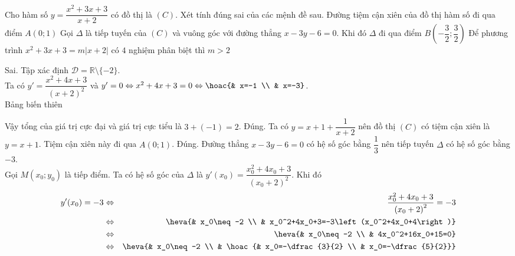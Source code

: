 \begin{ex}%
Cho hàm số $y=\dfrac{x^2+3 x+3}{x+2}$ có đồ thị là $(C)$. Xét tính đúng sai của các mệnh đề sau.
{\True Đường tiệm cận xiên của đồ thị hàm số đi qua điểm $A(0;1)$}
{\True Gọi $\Delta$ là tiếp tuyến của $(C)$ và vuông góc với đường thẳng $x-3 y-6=0$. Khi đó $\Delta$ đi qua điểm $B\left(-\dfrac{3}{2};\dfrac{3}{2}\right)$}
{Để phương trình $x^2+3x+3=m|x+2|$ có $4$ nghiệm phân biệt thì $m>2$}
\loigiai
{\begin{itemchoice}
\itemch Sai. Tập xác định $\mathscr{D}=\mathbb{R}\setminus\{-2\}$.\\
Ta có $y'=\dfrac{x^2+4x+3}{(x+2)^2}$ và $y'=0\Leftrightarrow x^2+4x+3=0\Leftrightarrow\hoac{& x=-1 \\ & x=-3}$.\\
Bảng biến thiên
\begin{center}
\end{center}
Vậy tổng của giá trị cực đại và giá trị cực tiểu là $3+(-1)=2$.
\itemch Đúng. Ta có $y=x+1+\dfrac{1}{x+2}$ nên đồ thị $(C)$ có tiệm cận xiên là $y=x+1$. Tiệm cận xiên này đi qua $A(0;1)$.
\itemch Đúng. Đường thẳng $x-3y-6=0$ có hệ số góc bằng $\dfrac{1}{3}$ nên tiếp tuyến $\Delta$ có hệ số góc bằng $-3$.\\
Gọi $M\left(x_0;y_0\right)$ là tiếp điểm. Ta có hệ số góc của $\Delta$ là $y'(x_0)=\dfrac{x_0^2+4x_0+3}{\left(x_0+2\right)^2}$. Khi đó
\allowdisplaybreaks\begin{eqnarray*}
y'(x_0)=-3&\Leftrightarrow & \dfrac{x_0^2+4x_0+3}{\left(x_0+2\right)^2}=-3\\
&\Leftrightarrow &\heva{& x_0\neq -2 \\ & x_0^2+4x_0+3=-3\left(x_0^2+4x_0+4\right)}\\
&\Leftrightarrow &\heva{& x_0\neq -2 \\ & 4x_0^2+16x_0+15=0}\\
&\Leftrightarrow &\heva{& x_0\neq -2 \\ & \hoac{& x_0=-\dfrac{3}{2} \\ & x_0=-\dfrac{5}{2}}}\\

\end{eqnarray*}
\end{itemchoice}}
\end{ex}
